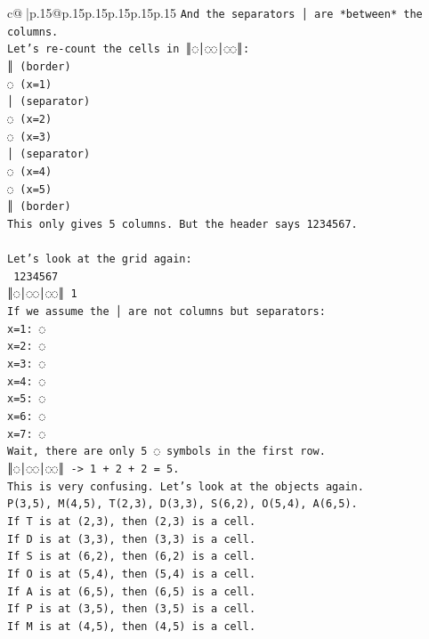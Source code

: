 \documentclass{article}
\begin{document}
{\begin{supertabular}{c@{$\;$}|p{.15\linewidth}@{}p{.15\linewidth}p{.15\linewidth}p{.15\linewidth}p{.15\linewidth}p{.15\linewidth}}
{{{\texttt{And the separators │ are *between* the columns.} \\
\texttt{Let's re{-}count the cells in ║◌│◌◌│◌◌║:} \\
\texttt{║ (border)} \\
\texttt{◌ (x=1)} \\
\texttt{│ (separator)} \\
\texttt{◌ (x=2)} \\
\texttt{◌ (x=3)} \\
\texttt{│ (separator)} \\
\texttt{◌ (x=4)} \\
\texttt{◌ (x=5)} \\
\texttt{║ (border)} \\
\texttt{This only gives 5 columns. But the header says 1234567.} \\
\\ 
\texttt{Let's look at the grid again:} \\
\texttt{ 1234567} \\
\texttt{║◌│◌◌│◌◌║ 1} \\
\texttt{If we assume the │ are not columns but separators:} \\
\texttt{x=1: ◌} \\
\texttt{x=2: ◌} \\
\texttt{x=3: ◌} \\
\texttt{x=4: ◌} \\
\texttt{x=5: ◌} \\
\texttt{x=6: ◌} \\
\texttt{x=7: ◌} \\
\texttt{Wait, there are only 5 ◌ symbols in the first row.} \\
\texttt{║◌│◌◌│◌◌║ {-}> 1 + 2 + 2 = 5.} \\
\texttt{This is very confusing. Let's look at the objects again.} \\
\texttt{P(3,5), M(4,5), T(2,3), D(3,3), S(6,2), O(5,4), A(6,5).} \\
\texttt{If T is at (2,3), then (2,3) is a cell.} \\
\texttt{If D is at (3,3), then (3,3) is a cell.} \\
\texttt{If S is at (6,2), then (6,2) is a cell.} \\
\texttt{If O is at (5,4), then (5,4) is a cell.} \\
\texttt{If A is at (6,5), then (6,5) is a cell.} \\
\texttt{If P is at (3,5), then (3,5) is a cell.} \\
\texttt{If M is at (4,5), then (4,5) is a cell.} \\
}}}
\end{supertabular}}
\end{document}

